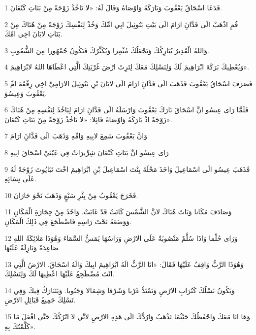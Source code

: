 \par 1 فَدَعَا اسْحَاقُ يَعْقُوبَ وَبَارَكَهُ وَاوْصَاهُ وَقَالَ لَهُ: «لا تَاخُذْ زَوْجَةً مِنْ بَنَاتِ كَنْعَانَ.
\par 2 قُمِ اذْهَبْ الَى فَدَّانَِ ارَامَ الَى بَيْتِ بَتُوئِيلَ ابِي امِّكَ وَخُذْ لِنَفْسِكَ زَوْجَةً مِنْ هُنَاكَ مِنْ بَنَاتِ لابَانَ اخِي امِّكَ.
\par 3 وَاللهُ الْقَدِيرُ يُبَارِكُكَ وَيَجْعَلُكَ مُثْمِرا وَيُكَثِّرُكَ فَتَكُونُ جُمْهُورا مِنَ الشُّعُوبِ.
\par 4 وَيُعْطِيكَ بَرَكَةَ ابْرَاهِيمَ لَكَ وَلِنَسْلِكَ مَعَكَ لِتَرِثَ ارْضَ غُرْبَتِكَ الَّتِي اعْطَاهَا اللهُ لابْرَاهِيمَ».
\par 5 فَصَرَفَ اسْحَاقُ يَعْقُوبَ فَذَهَبَ الَى فَدَّانَِ ارَامَ الَى لابَانَ بْنِ بَتُوئِيلَ الارَامِيِّ اخِي رِفْقَةَ امِّ يَعْقُوبَ وَعِيسُوَ.
\par 6 فَلَمَّا رَاى عِيسُو انَّ اسْحَاقَ بَارَكَ يَعْقُوبَ وَارْسَلَهُ الَى فَدَّانَِ ارَامَ لِيَاخُذَ لِنَفْسِهِ مِنْ هُنَاكَ زَوْجَةً اذْ بَارَكَهُ وَاوْصَاهُ قَائِلا: «لا تَاخُذْ زَوْجَةً مِنْ بَنَاتِ كَنْعَانَ».
\par 7 وَانَّ يَعْقُوبَ سَمِعَ لابِيهِ وَامِّهِ وَذَهَبَ الَى فَدَّانَِ ارَامَ
\par 8 رَاى عِيسُو انَّ بَنَاتِ كَنْعَانَ شِرِّيرَاتٌ فِي عَيْنَيْ اسْحَاقَ ابِيهِ
\par 9 فَذَهَبَ عِيسُو الَى اسْمَاعِيلَ وَاخَذَ مَحْلَةَ بِنْتَ اسْمَاعِيلَ بْنِ ابْرَاهِيمَ اخْتَ نَبَايُوتَ زَوْجَةً لَهُ عَلَى نِسَائِهِ.
\par 10 فَخَرَجَ يَعْقُوبُ مِنْ بِئْرِ سَبْعٍ وَذَهَبَ نَحْوَ حَارَانَ.
\par 11 وَصَادَفَ مَكَانا وَبَاتَ هُنَاكَ لانَّ الشَّمْسَ كَانَتْ قَدْ غَابَتْ. وَاخَذَ مِنْ حِجَارَةِ الْمَكَانِ وَوَضَعَهُ تَحْتَ رَاسِهِ فَاضْطَجَعَ فِي ذَلِكَ الْمَكَانِ.
\par 12 وَرَاى حُلْما وَاذَا سُلَّمٌ مَنْصُوبَةٌ عَلَى الارْضِ وَرَاسُهَا يَمَسُّ السَّمَاءَ وَهُوَذَا مَلائِكَةُ اللهِ صَاعِدَةٌ وَنَازِلَةٌ عَلَيْهَا
\par 13 وَهُوَذَا الرَّبُّ وَاقِفٌ عَلَيْهَا فَقَالَ: «انَا الرَّبُّ الَهُ ابْرَاهِيمَ ابِيكَ وَالَهُ اسْحَاقَ. الارْضُ الَّتِي انْتَ مُضْطَجِعٌ عَلَيْهَا اعْطِيهَا لَكَ وَلِنَسْلِكَ.
\par 14 وَيَكُونُ نَسْلُكَ كَتُرَابِ الارْضِ وَتَمْتَدُّ غَرْبا وَشَرْقا وَشِمَالا وَجَنُوبا. وَيَتَبَارَكُ فِيكَ وَفِي نَسْلِكَ جَمِيعُ قَبَائِلِ الارْضِ.
\par 15 وَهَا انَا مَعَكَ وَاحْفَظُكَ حَيْثُمَا تَذْهَبُ وَارُدُّكَ الَى هَذِهِ الارْضِ لانِّي لا اتْرُكُكَ حَتَّى افْعَلَ مَا كَلَّمْتُكَ بِهِ».
